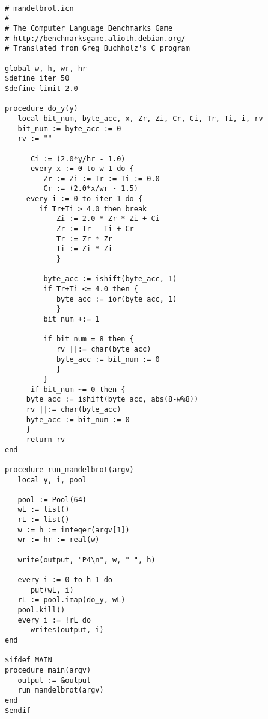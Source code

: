 \documentclass[letterpaper,12pt]{article}
\begin{document}
\begin{verbatim}

# mandelbrot.icn
#
# The Computer Language Benchmarks Game
# http://benchmarksgame.alioth.debian.org/
# Translated from Greg Buchholz's C program   

global w, h, wr, hr
$define iter 50
$define limit 2.0

procedure do_y(y)
   local bit_num, byte_acc, x, Zr, Zi, Cr, Ci, Tr, Ti, i, rv
   bit_num := byte_acc := 0
   rv := ""
      
      Ci := (2.0*y/hr - 1.0)
      every x := 0 to w-1 do {
         Zr := Zi := Tr := Ti := 0.0
         Cr := (2.0*x/wr - 1.5) 
	 every i := 0 to iter-1 do {
	    if Tr+Ti > 4.0 then break
            Zi := 2.0 * Zr * Zi + Ci
            Zr := Tr - Ti + Cr
            Tr := Zr * Zr
            Ti := Zi * Zi
            }
         
         byte_acc := ishift(byte_acc, 1) 
         if Tr+Ti <= 4.0 then { 
            byte_acc := ior(byte_acc, 1)
            }          
         bit_num +:= 1 

         if bit_num = 8 then {
            rv ||:= char(byte_acc)
            byte_acc := bit_num := 0
            }
         }
      if bit_num ~= 0 then {
	 byte_acc := ishift(byte_acc, abs(8-w%8))
	 rv ||:= char(byte_acc)
	 byte_acc := bit_num := 0
	 }
     return rv
end

procedure run_mandelbrot(argv)
   local y, i, pool

   pool := Pool(64)
   wL := list()
   rL := list()
   w := h := integer(argv[1])
   wr := hr := real(w)
   
   write(output, "P4\n", w, " ", h)

   every i := 0 to h-1 do
      put(wL, i)
   rL := pool.imap(do_y, wL)
   pool.kill()
   every i := !rL do
      writes(output, i)
end

$ifdef MAIN
procedure main(argv)
   output := &output
   run_mandelbrot(argv)
end
$endif

\end{verbatim}

\newpage
\end{document}

